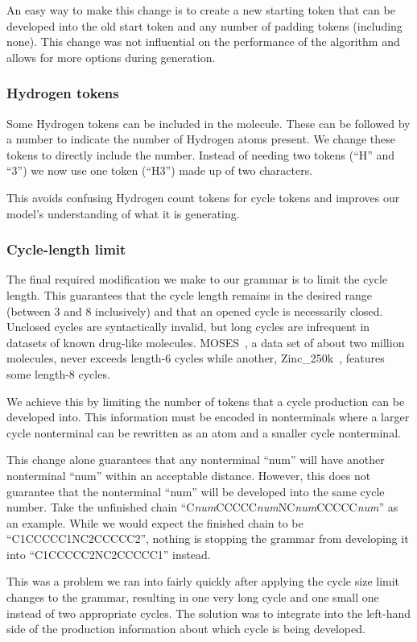 \documentclass[../Document.tex]{subfiles}
\begin{document}
An easy way to make this change is to create a new starting token that can be developed into the old start token and any number of padding tokens (including none). This change was not influential on the performance of the algorithm and allows for more options during generation.


\subsubsection{Hydrogen tokens}
Some Hydrogen tokens can be included in the molecule. These can be followed by a number to indicate the number of Hydrogen atoms present. We change these tokens to directly include the number.
Instead of needing two tokens (``H'' and ``3'') we now use one token (``H3'') made up of two characters.

This avoids confusing Hydrogen count tokens for cycle tokens and improves our model's understanding of what it is generating.


\subsubsection{Cycle-length limit}
The final required modification we make to our grammar is to limit the cycle length. This guarantees that the cycle length remains in the desired range (between 3 and 8 inclusively) and that an opened cycle is necessarily closed. Unclosed cycles are syntactically invalid, but long cycles are infrequent in datasets of known drug-like molecules.
MOSES~\cite{MOSES}, a data set of about two million molecules, never exceeds length-6 cycles while another, Zinc\_250k~\cite{Akhmetshin2021}, features some length-8 cycles. 

We achieve this by limiting the number of tokens that a cycle production can be developed into. This information must be encoded in nonterminals where a larger cycle nonterminal can be rewritten as an atom and a smaller cycle nonterminal.

This change alone guarantees that any nonterminal ``num'' will have another nonterminal ``num'' within an acceptable distance. However, this does not guarantee that the nonterminal ``num'' will be developed into the same cycle number. Take the unfinished chain ``C\textit{num}CCCCC\textit{num}NC\textit{num}CCCCC\textit{num}'' as an example. While we would expect the finished chain to be ``C1CCCCC1NC2CCCCC2'', nothing is stopping the grammar from developing it into ``C1CCCCC2NC2CCCCC1'' instead.

This was a problem we ran into fairly quickly after applying the cycle size limit changes to the grammar, resulting in one very long cycle and one small one instead of two appropriate cycles. The solution was to integrate into the left-hand side of the production information about which cycle is being developed.
\end{document}
